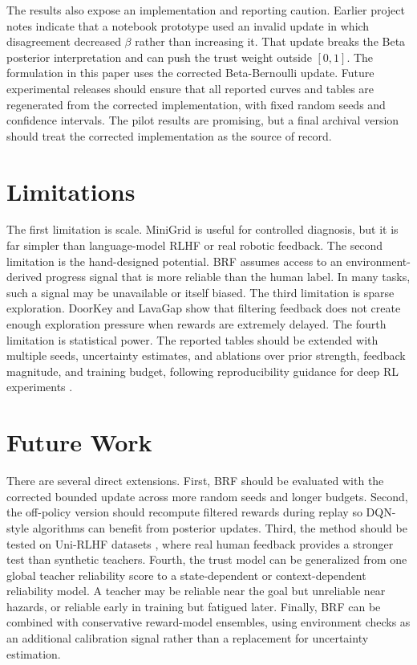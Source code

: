\documentclass[11pt]{article}
\begin{document}
The results also expose an implementation and reporting caution. Earlier project notes indicate that a notebook prototype used an invalid update in which disagreement decreased $\beta$ rather than increasing it. That update breaks the Beta posterior interpretation and can push the trust weight outside $[0,1]$. The formulation in this paper uses the corrected Beta-Bernoulli update. Future experimental releases should ensure that all reported curves and tables are regenerated from the corrected implementation, with fixed random seeds and confidence intervals. The pilot results are promising, but a final archival version should treat the corrected implementation as the source of record.

\section{Limitations}

The first limitation is scale. MiniGrid is useful for controlled diagnosis, but it is far simpler than language-model RLHF or real robotic feedback. The second limitation is the hand-designed potential. BRF assumes access to an environment-derived progress signal that is more reliable than the human label. In many tasks, such a signal may be unavailable or itself biased. The third limitation is sparse exploration. DoorKey and LavaGap show that filtering feedback does not create enough exploration pressure when rewards are extremely delayed. The fourth limitation is statistical power. The reported tables should be extended with multiple seeds, uncertainty estimates, and ablations over prior strength, feedback magnitude, and training budget, following reproducibility guidance for deep RL experiments \cite{henderson2018deep,patterson2023empirical}.

\section{Future Work}

There are several direct extensions. First, BRF should be evaluated with the corrected bounded update across more random seeds and longer budgets. Second, the off-policy version should recompute filtered rewards during replay so DQN-style algorithms can benefit from posterior updates. Third, the method should be tested on Uni-RLHF datasets \cite{yuan2024unirlfh}, where real human feedback provides a stronger test than synthetic teachers. Fourth, the trust model can be generalized from one global teacher reliability score to a state-dependent or context-dependent reliability model. A teacher may be reliable near the goal but unreliable near hazards, or reliable early in training but fatigued later. Finally, BRF can be combined with conservative reward-model ensembles, using environment checks as an additional calibration signal rather than a replacement for uncertainty estimation.
\end{document}
